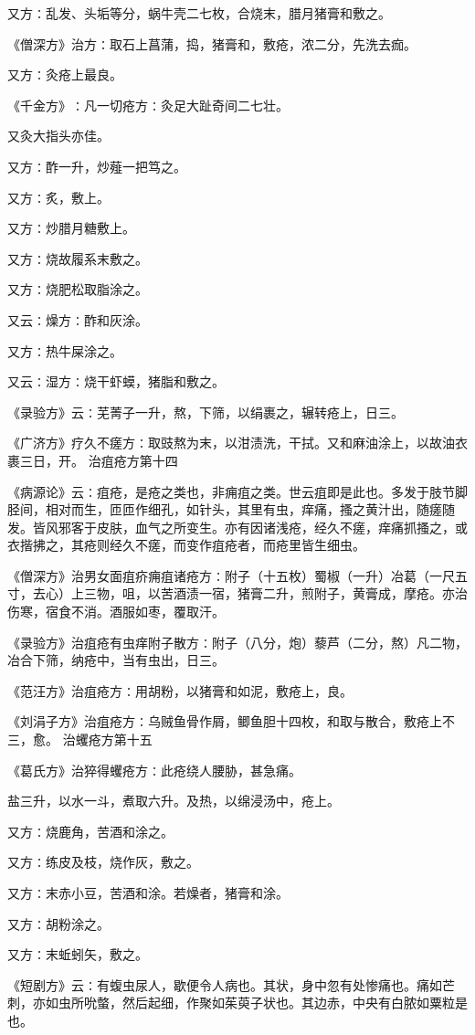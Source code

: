 \documentclass[a4paper,12pt,UTF8,twoside]{ctexbook}
\begin{document}
又方∶乱发、头垢等分，蜗牛壳二七枚，合烧末，腊月猪膏和敷之。

《僧深方》治方∶取石上菖蒲，捣，猪膏和，敷疮，浓二分，先洗去痂。

又方∶灸疮上最良。

《千金方》∶凡一切疮方∶灸足大趾奇间二七壮。

又灸大指头亦佳。

又方∶酢一升，炒薤一把笃之。

又方∶炙，敷上。

又方∶炒腊月糖敷上。

又方∶烧故履系末敷之。

又方∶烧肥松取脂涂之。

又云∶燥方∶酢和灰涂。

又方∶热牛屎涂之。

又云∶湿方∶烧干虾蟆，猪脂和敷之。

《录验方》云∶芜菁子一升，熬，下筛，以绢裹之，辗转疮上，日三。

《广济方》疗久不瘥方∶取豉熬为末，以泔渍洗，干拭。又和麻油涂上，以故油衣裹三日，开。
治疽疮方第十四

《病源论》云∶疽疮，是疮之类也，非痈疽之类。世云疽即是此也。多发于肢节脚胫间，相对而生，匝匝作细孔，如针头，其里有虫，痒痛，搔之黄汁出，随瘥随发。皆风邪客于皮肤，血气之所变生。亦有因诸浅疮，经久不瘥，痒痛抓搔之，或衣揩拂之，其疮则经久不瘥，而变作疽疮者，而疮里皆生细虫。

《僧深方》治男女面疽疥痈疽诸疮方∶附子（十五枚）蜀椒（一升）冶葛（一尺五寸，去心）上三物，咀，以苦酒渍一宿，猪膏二升，煎附子，黄膏成，摩疮。亦治伤寒，宿食不消。酒服如枣，覆取汗。

《录验方》治疽疮有虫痒附子散方∶附子（八分，炮）藜芦（二分，熬）凡二物，冶合下筛，纳疮中，当有虫出，日三。

《范汪方》治疽疮方∶用胡粉，以猪膏和如泥，敷疮上，良。

《刘涓子方》治疽疮方∶乌贼鱼骨作屑，鲫鱼胆十四枚，和取与散合，敷疮上不三，愈。
治蠼疮方第十五

《葛氏方》治猝得蠼疮方∶此疮绕人腰胁，甚急痛。

盐三升，以水一斗，煮取六升。及热，以绵浸汤中，疮上。

又方∶烧鹿角，苦酒和涂之。

又方∶练皮及枝，烧作灰，敷之。

又方∶末赤小豆，苦酒和涂。若燥者，猪膏和涂。

又方∶胡粉涂之。

又方∶末蚯蚓矢，敷之。

《短剧方》云∶有蝮虫尿人，歇便令人病也。其状，身中忽有处惨痛也。痛如芒刺，亦如虫所吮螫，然后起细，作聚如茱萸子状也。其边赤，中央有白脓如粟粒是也。
\end{document}
